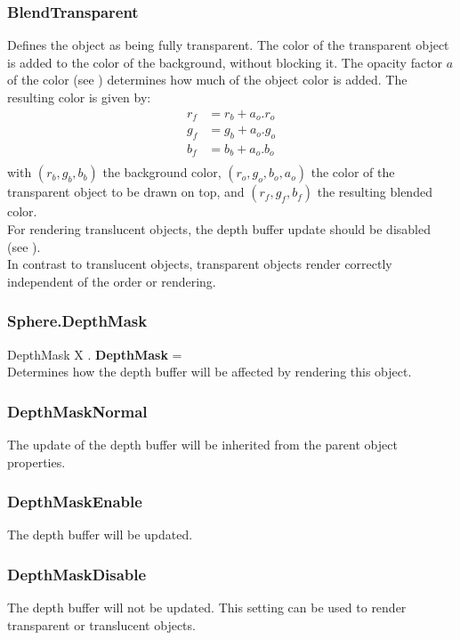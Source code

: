 \subsubsection{BlendTransparent \label{T:BlendType|BlendTransparent}}
Defines the object as being fully transparent. The color of the transparent object is added to the color of the background, without blocking it. The opacity factor $a$ of the color (see ) determines how much of the object color is added. The resulting color is given by:
\begin{equation}
\begin{array}{rcl}
r_f & = r_b + a_o . r_o \\
g_f & = g_b + a_o . g_o \\
b_f & = b_b + a_o . b_o \\
\end{array}
\end{equation}
with $(r_b,g_b,b_b)$ the background color, $(r_o,g_o,b_o,a_o)$ the color of the transparent object to be drawn on top, and $(r_f,g_f,b_f)$ the resulting blended color. \\
For rendering translucent objects, the depth buffer update should be disabled (see ). \\
In contrast to translucent objects, transparent objects render correctly independent of the order or rendering.

\subsubsection{Sphere.DepthMask \label{F:Sphere:DepthMask}}
DepthMask X . \textbf{DepthMask} = \\
Determines how the depth buffer will be affected by rendering this object.

\subsubsection{DepthMaskNormal \label{T:DepthMask|DepthMaskNormal}}
The update of the depth buffer will be inherited from the parent object properties.

\subsubsection{DepthMaskEnable \label{T:DepthMask|DepthMaskEnable}}
The depth buffer will be updated.

\subsubsection{DepthMaskDisable \label{T:DepthMask|DepthMaskDisable}}
The depth buffer will not be updated. This setting can be used to render transparent or translucent objects.

